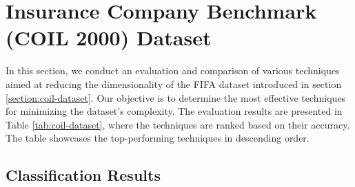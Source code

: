 \section{Insurance Company Benchmark (COIL 2000) Dataset}

In this section, we conduct an evaluation and comparison of various techniques aimed at reducing the dimensionality of the FIFA dataset introduced in section \ref{section:coil-dataset}. Our objective is to determine the most effective techniques for minimizing the dataset's complexity. The evaluation results are presented in Table \ref{tab:coil-dataset}, where the techniques are ranked based on their accuracy. The table showcases the top-performing techniques in descending order.

\subsection{Classification Results}

